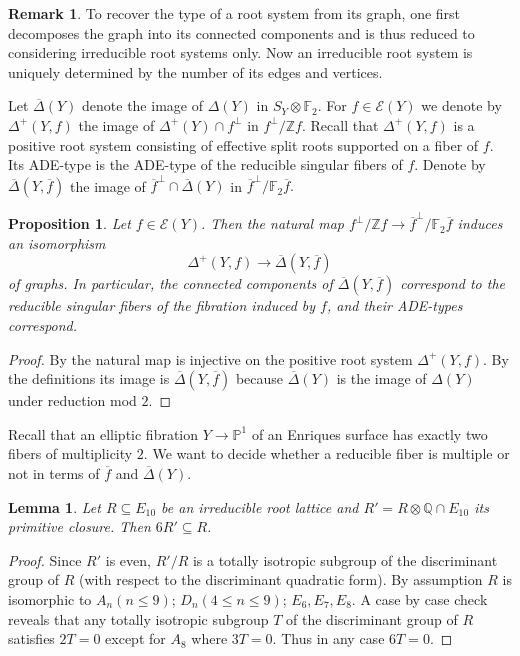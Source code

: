 \documentclass{amsart}
\theoremstyle{definition}
\newtheorem{remark}[definition]{Remark}
\theoremstyle{plain}
\newtheorem{lemma}[definition]{Lemma}
\newtheorem{proposition}[definition]{Proposition}
\newcommand{\QQ}{\mathbb{Q}}
\newcommand{\FF}{\mathbb{F}}
\newcommand{\ZZ}{\mathbb{Z}}
\newcommand{\E}{\mathcal{E}}
\begin{document}
\begin{remark}
 To recover the type of a root system from its graph, one first decomposes the graph into its connected components and is thus reduced to considering irreducible root systems only. Now an irreducible root system is uniquely determined by the number of its edges and vertices.
\end{remark}
Let $\overline{\Delta}(Y)$ denote the image of $\Delta(Y)$ in $S_Y\otimes \FF_2$.
For $f \in \E(Y)$ we denote by $\Delta^+(Y, f)$ the image of $\Delta^+(Y) \cap f^\perp$ in $f^\perp/\ZZ f$.
Recall that $\Delta^+(Y,f)$ is a positive root system consisting of effective split roots supported on a fiber of $f$. Its ADE-type is the ADE-type of the reducible singular fibers of $f$.
Denote by $\overline{\Delta}(Y,  \overline{f})$ the image of \(\overline{f}^\perp \cap \overline{\Delta}(Y) \) in  \(\overline{f}^\perp/ \FF_2 \overline{f}.\)
\begin{proposition}\label{prop:ADE-type}
 Let $f \in \E(Y)$.
 Then the  natural map \(f ^\perp / \ZZ f \to \overline{f}^\perp / \FF_2 \overline{f}\) induces an isomorphism
 \[\Delta^+(Y, f) \to \overline{\Delta}(Y,\overline{f})\]
 of graphs.
 In particular, the connected components of \(\overline{\Delta}(Y,\overline{f})\) correspond to the reducible singular fibers of the fibration induced by $f$, and their ADE-types correspond.
 \end{proposition}
\begin{proof}
By  the natural map is injective on the positive root system \(\Delta^+(Y,f)\). By the definitions its image is \(\overline{\Delta}(Y,\overline{f})\) because $\overline{\Delta}(Y)$ is the image of $\Delta(Y)$ under reduction mod $2$.
\end{proof}
Recall that an elliptic fibration $Y \to \mathbb{P}^1$ of an Enriques surface has exactly two fibers of multiplicity $2$.
We want to decide whether a reducible fiber is multiple or not in terms of $\overline{f}$ and $\overline{\Delta}(Y)$.
\begin{lemma}\label{lem:6R}
Let \(R\subseteq E_{10}\) be an irreducible root lattice and $R'= R\otimes \QQ \cap E_{10}$ its primitive closure.
Then \(6 R' \subseteq R\).
\end{lemma}
\begin{proof}
Since \(R'\) is even, \( R'/R \) is a totally isotropic subgroup of the discriminant group of $R$ (with respect to the discriminant quadratic form). By assumption \(R\) is isomorphic to \(A_n (n\leq 9)\); \(D_n (4 \leq n\leq 9)\); \(E_6, E_7, E_8\). A case by case check reveals that any totally isotropic subgroup $T$ of the discriminant group of $R$ satisfies $2T =0$ except for $A_8$ where $3 T =0$. Thus in any case \(6T =0 \).
\end{proof}
\end{document}
